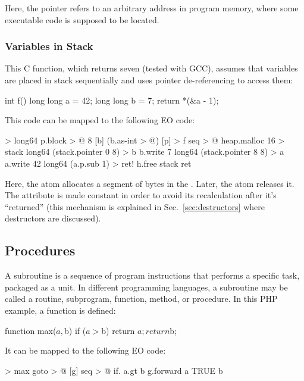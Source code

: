 \documentclass[sigplan,11pt,nonacm,natbib=false]{acmart}
\begin{document}
Here, the pointer refers to an arbitrary address in program memory, where some executable code is supposed to be located.

\subsubsection{Variables in Stack}

This C function, which returns seven (tested with GCC), assumes that variables are placed in stack sequentially and uses pointer de-referencing to access them:

\begin{ffcode}
int f() {
  long long a = 42;
  long long b = 7;
  return *(&a - 1);
}
\end{ffcode}

This code can be mapped to the following EO code:

\begin{ffcode}
[p] > long64
  p.block > @
    8
    [b] (b.as-int > @)
[p] > f
  seq > @
    heap.malloc 16 > stack
    long64 (stack.pointer 0 8) > b
    b.write 7
    long64 (stack.pointer 8 8) > a
    a.write 42
    long64 (a.p.sub 1) > ret!
    h.free stack
    ret
\end{ffcode}

Here, the atom  allocates a segment of bytes in the . Later, the atom  releases it. The attribute  is made constant in order to avoid its recalculation after it's ``returned'' (this mechanism is explained in Sec.~\ref{sec:destructors} where destructors are discussed).

\subsection{Procedures}
\label{sec:procedures}

A subroutine is a sequence of program instructions that performs a specific task, packaged as a unit. In different programming languages, a subroutine may be called a routine, subprogram, function, method, or procedure. In this PHP example, a function  is defined:

\begin{ffcode}
function max($a, $b) {
  if ($a > $b) return $a;
  return $b;
}
\end{ffcode}

It can be mapped to the following EO code:

\begin{ffcode}
[a b] > max
  goto > @
    [g]
      seq > @
        if.
          a.gt b
          g.forward a
          TRUE
        b
\end{ffcode}
\end{document}
